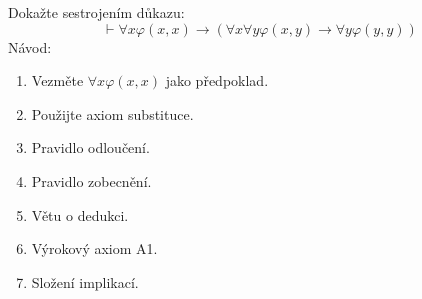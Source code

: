 Dokažte sestrojením důkazu:
$$\vdash \forall x \varphi(x,x)\rightarrow(\forall x \forall y \varphi
(x,y)\rightarrow \forall y \varphi (y,y))$$
Návod:
\begin{enumerate}[(1)]
  \item Vezměte $\forall x \varphi(x,x)$ jako předpoklad.
  \item Použijte axiom substituce.
  \item Pravidlo odloučení.
  \item Pravidlo zobecnění.
  \item Větu o dedukci.
  \item Výrokový axiom A1.
  \item Složení implikací.
\end{enumerate}
